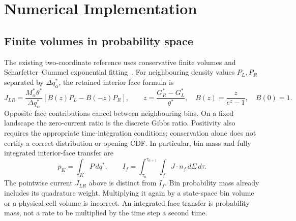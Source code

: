 \documentclass[11pt]{article}
\begin{document}
\section{Numerical Implementation}
\subsection{Finite volumes in probability space}
The existing two-coordinate reference uses conservative finite volumes and
Scharfetter--Gummel exponential fitting~\cite{ScharfetterGummel1969}.
For neighbouring density values $P_L,P_R$ separated by $\Delta q_\alpha^*$,
the retained interior face formula is
\begin{equation}
 J_{LR}=\frac{M_\alpha^*\theta^*}{\Delta q_\alpha^*}
 \left[B(z)P_L-B(-z)P_R\right],\qquad
 z=\frac{G_R^*-G_L^*}{\theta^*},\quad B(z)=\frac{z}{e^z-1},\quad B(0)=1.
\end{equation}
Opposite face contributions cancel between neighbouring bins. On a fixed
landscape the zero-current ratio is the discrete Gibbs ratio.
Positivity also requires the appropriate time-integration conditions;
conservation alone does not certify a correct distribution or opening CDF.
In particular, bin mass and fully integrated interior-face transfer are
\begin{equation}
 p_K=\int_K P\,dq^*,\qquad
 I_f=\int_{\tau_n}^{\tau_{n+1}}\int_f J\cdot n_f\,d\Sigma\,d\tau.
\end{equation}
The pointwise current $J_{LR}$ above is distinct from $I_f$.
Bin probability mass already includes its quadrature weight. Multiplying it
again by a state-space bin volume or a physical cell volume is incorrect.
An integrated face transfer is probability mass, not a rate to be multiplied
by the time step a second time.
\end{document}
